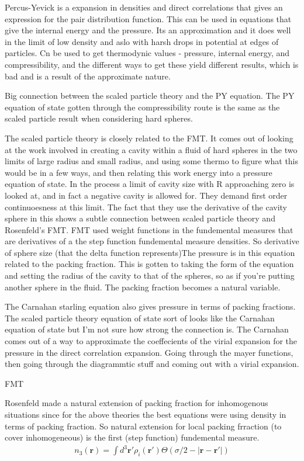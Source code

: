 \documentclass[pdftex,10pt,a4paper]{article}
\begin{document}
Percus-Yevick is a expansion in densities and direct correlations that gives an expression for the pair distribution function.  This can be used in equations that give the internal energy and the pressure.  Its an approximation and it does well in the limit of low density and aslo with harsh drops in potential at edges of particles.  Cn be used to get thermodynic values - pressure, internal energy, and compressibility, and the different ways to get these yield different results, which is bad and is a result of the approximate nature.

Big connection between the scaled particle theory and the PY equation.  The PY equation of state gotten through the compressibility route is the same as the scaled particle result when considering hard spheres.

The scaled particle theory is closely related to the FMT.  It comes out of looking at the work involved in creating a cavity within a fluid of hard spheres in the two limits of large radius and small radius, and using some thermo to figure what this would be in a few ways, and then relating this work energy into a pressure equation of state.  In the process a limit of cavity size with R approaching zero is looked at, and in fact a negative cavity is allowed for.  They demand first order continuoesness at this limit.  The fact that they use the derivative of the cavity sphere in this shows a subtle connection between scaled particle theory and Rosenfeld's FMT.  FMT used weight functions in the fundemental measures that are derivatives of a the step function fundemental measure densities.  So derivative of sphere size (that the delta function represents)The pressure is in this equation related to the packing fraction.  This is gotten to taking the form of the equation and setting the radius of the cavity to that of the spheres, so as if you're putting another sphere in the fluid.  The packing fraction becomes a natural variable.

The Carnahan starling equation also gives pressure in terms of packing fractions.  The scaled particle theory equation of state sort of looks like the Carnahan equation of state but I'm not sure how strong the connection is.  The Carnahan comes out of a way to approximate the coeffecients of the virial expansion for the pressure in the direct correlation expansion.  Going through the mayer functions, then going through the diagrammtic stuff and coming out with a virial expansion.

FMT

Rosenfeld made a natural extension of packing fraction for inhomogenous situations since for the above theories the best equations were using density in terms of packing fraction. So natural extension for local packing frraction (to cover inhomogeneous) is the first (step function) fundemental measure.
\begin{align}
  n_3(\mathbf{r}) =
  \int d^3\mathbf{r}'\rho_i(\mathbf{r}')\Theta(\sigma/2-|\mathbf{r}-\mathbf{r}'|)
\end{align}
\end{document}
